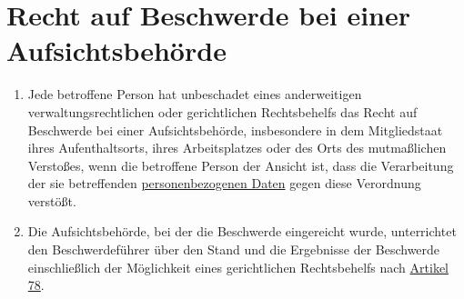 \chapter{Recht auf Beschwerde bei einer Aufsichtsbehörde}
\label{ch:77}


\begin{enumerate}

  \item Jede betroffene Person hat unbeschadet eines anderweitigen verwaltungsrechtlichen oder gerichtlichen
   Rechtsbehelfs das Recht auf Beschwerde bei einer Aufsichtsbehörde, insbesondere in dem Mitgliedstaat ihres
   Aufenthaltsorts, ihres Arbeitsplatzes oder des Orts des mutmaßlichen Verstoßes, wenn die betroffene Person der
   Ansicht ist, dass die Verarbeitung der sie betreffenden \hyperref[itm:04-1]{personenbezogenen Daten} gegen diese Verordnung verstößt.
  \label{itm:77-1}

  \item Die Aufsichtsbehörde, bei der die Beschwerde eingereicht wurde, unterrichtet den Beschwerdeführer über den Stand
   und die Ergebnisse der Beschwerde einschließlich der Möglichkeit eines gerichtlichen Rechtsbehelfs nach \hyperref
   [ch:78]{Artikel 78}.
  \label{itm:77-2}

\end{enumerate}


